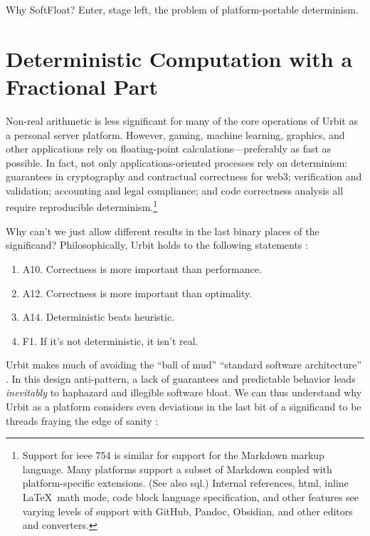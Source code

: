 \documentclass[twoside]{article}
\begin{document}
Why SoftFloat?  Enter, stage left, the problem of platform-portable determinism.


\section[Deterministic\,Computation\,with\,Fractional\,Part]{Deterministic Computation with a \\ Fractional Part}

Non-real arithmetic is less significant for many of the core operations of Urbit as a personal server platform.  However, gaming, machine learning, graphics, and other applications rely on floating-point calculations—preferably as fast as possible.  In fact, not only applications-oriented processes rely on determinism:  guarantees in cryptography and contractual correctness for web3; verification and validation; accounting and legal compliance; and code correctness analysis all require reproducible determinism.\footnote{Support for {\sc ieee} 754 is similar for support for the Markdown markup language.  Many platforms support a subset of Markdown coupled with platform-specific extensions.  (See also {\sc sql}.)  Internal references, {\sc html}, inline \LaTeX~math mode, code block language specification, and other features see varying levels of support with GitHub, Pandoc, Obsidian, and other editors and converters.}

Why can't we just allow different results in the last binary places of the significand?  Philosophically, Urbit holds to the following statements \citep{Monk2020}:

\begin{enumerate}
  \item  A10.  Correctness is more important than performance.
  \item  A12.  Correctness is more important than optimality.
  \item  A14.  Deterministic beats heuristic.
  \item  F1.  If it's not deterministic, it isn't real.
\end{enumerate}

\noindent
Urbit makes much of avoiding the “ball of mud” “standard software architecture” \citep{Foote1999}.  In this design anti-pattern, a lack of guarantees and predictable behavior leads \emph{inevitably} to haphazard and illegible software bloat.  We can thus understand why Urbit as a platform considers even deviations in the last bit of a significand to be threads fraying the edge of sanity \citep{Monk2020a}:
\end{document}

